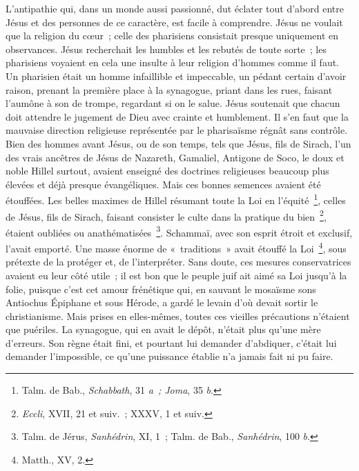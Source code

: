\documentclass[french,twoside]{book} %
\begin{document}
L’antipathie qui, dans un monde aussi passionné, dut éclater tout d’abord entre Jésus et des personnes de ce caractère, est facile à comprendre. Jésus ne voulait que la religion du cœur ; celle des pharisiens consistait presque uniquement en observances. Jésus recherchait les humbles et les rebutés de toute sorte ; les pharisiens voyaient en cela une insulte à leur religion d’hommes comme il faut. Un pharisien était un homme infaillible et impeccable, un pédant certain d’avoir raison, prenant la première place à la synagogue, priant dans les rues, faisant l’aumône à son de trompe, regardant si on le salue. Jésus soutenait que chacun doit attendre le jugement de Dieu avec crainte et humblement. Il s’en faut que la mauvaise direction religieuse représentée par le pharisaïsme régnât sans contrôle. Bien des hommes avant Jésus, ou de son temps, tels que Jésus, fils de Sirach, l’un des vrais ancêtres de Jésus de Nazareth, Gamaliel, Antigone de Soco, le doux et noble Hillel surtout, avaient enseigné des doctrines religieuses beaucoup plus élevées et déjà presque évangéliques. Mais ces bonnes semences avaient été étouffées. Les belles maximes de Hillel résumant toute la Loi en l’équité \footnote{ Talm. de Bab., {\itshape Schabbath}, 31 {\itshape a ; Joma}, 35 {\itshape b}.}, celles de Jésus, fils de Sirach, faisant consister le culte dans la pratique du bien \footnote{{\itshape Eccli}, XVII, 21 et suiv. ; XXXV, 1 et suiv.}, étaient oubliées ou anathématisées \footnote{ Talm. de Jérus, {\itshape Sanhédrin}, XI, 1 ; Talm. de Bab., {\itshape Sanhédrin}, 100 {\itshape b}.}. Schammaï, avec son esprit étroit et exclusif, l’avait emporté. Une masse énorme de « traditions » avait étouffé la Loi \footnote{Matth., XV, 2.}, sous prétexte de la protéger et, de l’interpréter. Sans doute, ces mesures conservatrices avaient eu leur côté utile ; il est bon que le peuple juif ait aimé sa Loi jusqu’à la folie, puisque c’est cet amour frénétique qui, en sauvant le mosaïsme sons Antiochus Épiphane et sous Hérode, a gardé le levain d’où devait sortir le christianisme. Mais prises en elles-mêmes, toutes ces vieilles précautions n’étaient que puériles. La synagogue, qui en avait le dépôt, n’était plus qu’une mère d’erreurs. Son règne était fini, et pourtant lui demander d’abdiquer, c’était lui demander l’impossible, ce qu’une puissance établie n’a jamais fait ni pu faire.\par
\end{document}
